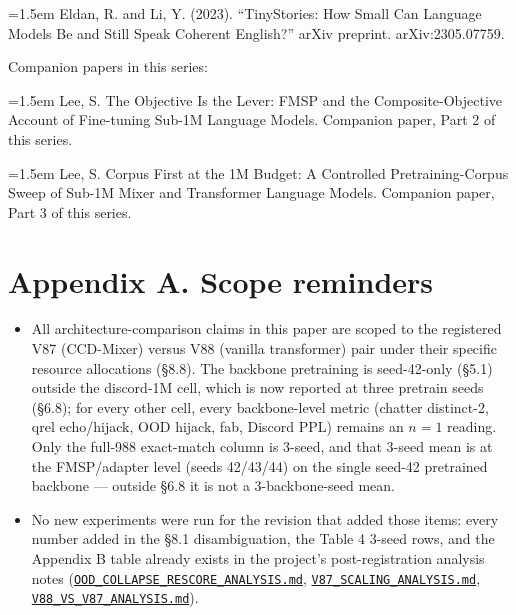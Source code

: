 \documentclass[11pt]{article}
\begin{document}
\par\hangindent=1.5em
Eldan, R. and Li, Y. (2023). ``TinyStories: How Small Can Language Models Be and Still Speak Coherent English?'' arXiv preprint. arXiv:2305.07759.

\bigskip

\noindent Companion papers in this series:

\par\hangindent=1.5em
Lee, S. The Objective Is the Lever: FMSP and the Composite-Objective Account of Fine-tuning Sub-1M Language Models. Companion paper, Part 2 of this series.

\par\hangindent=1.5em
Lee, S. Corpus First at the 1M Budget: A Controlled Pretraining-Corpus Sweep of Sub-1M Mixer and Transformer Language Models. Companion paper, Part 3 of this series.

\appendix

\section*{Appendix A. Scope reminders}

\begin{itemize}
\item All architecture-comparison claims in this paper are scoped to the registered V87 (CCD-Mixer) versus V88 (vanilla transformer) pair under their specific resource allocations (\S8.8). The backbone pretraining is seed-42-only (\S5.1) outside the discord-1M cell, which is now reported at three pretrain seeds (\S6.8); for every other cell, every backbone-level metric (chatter distinct-2, qrel echo/hijack, OOD hijack, fab, Discord PPL) remains an $n=1$ reading. Only the full-988 exact-match column is 3-seed, and that 3-seed mean is at the FMSP/adapter level (seeds 42/43/44) on the single seed-42 pretrained backbone --- outside \S6.8 it is not a 3-backbone-seed mean.
\item No new experiments were run for the revision that added those items: every number added in the \S8.1 disambiguation, the Table 4 3-seed rows, and the Appendix B table already exists in the project's post-registration analysis notes (\href{https://github.com/llaa33219/MicroMixer-4/blob/4bb630413dfa58ef3141291e121ab8c006d03235/OOD_COLLAPSE_RESCORE_ANALYSIS.md}{\texttt{OOD\_COLLAPSE\_RESCORE\_ANALYSIS.md}}, \href{https://github.com/llaa33219/MicroMixer-4/blob/4bb630413dfa58ef3141291e121ab8c006d03235/V87_SCALING_ANALYSIS.md}{\texttt{V87\_SCALING\_ANALYSIS.md}}, \href{https://github.com/llaa33219/MicroMixer-4/blob/4bb630413dfa58ef3141291e121ab8c006d03235/V88_VS_V87_ANALYSIS.md}{\texttt{V88\_VS\_V87\_ANALYSIS.md}}).
\end{itemize}
\end{document}
